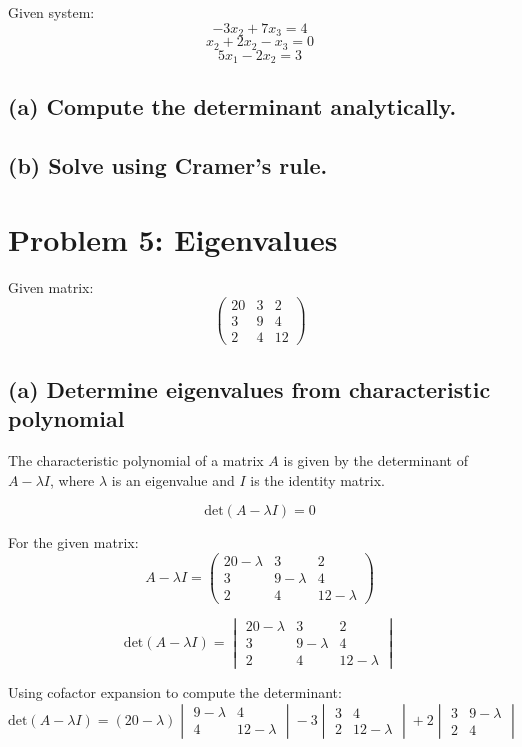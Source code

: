 \documentclass{article}
\begin{document}
Given system:
\[ -3x_2 + 7x_3 = 4 \]
\[ x_2 + 2x_2 - x_3 = 0 \]
\[ 5x_1 - 2x_2 = 3 \]

\subsection*{(a) Compute the determinant analytically.}

\subsection*{(b) Solve using Cramer's rule.}

\section*{Problem 5: Eigenvalues}

Given matrix:
\[ \begin{pmatrix} 20 & 3 & 2 \\ 3 & 9 & 4 \\ 2 & 4 & 12 \end{pmatrix} \]

\subsection*{(a) Determine eigenvalues from characteristic polynomial}

The characteristic polynomial of a matrix \( A \) is given by the determinant of \( A - \lambda I \), where \( \lambda \) is an eigenvalue and \( I \) is the identity matrix.

\[ \text{det}(A - \lambda I) = 0 \]

For the given matrix:
\[ A - \lambda I = \begin{pmatrix} 20 - \lambda & 3 & 2 \\ 3 & 9 - \lambda & 4 \\ 2 & 4 & 12 - \lambda \end{pmatrix} \]

\[ \text{det}(A - \lambda I) = \begin{vmatrix} 20 - \lambda & 3 & 2 \\ 3 & 9 - \lambda & 4 \\ 2 & 4 & 12 - \lambda \end{vmatrix} \]

Using cofactor expansion to compute the determinant:
\[ \text{det}(A - \lambda I) = (20 - \lambda) \begin{vmatrix} 9 - \lambda & 4 \\ 4 & 12 - \lambda \end{vmatrix} - 3 \begin{vmatrix} 3 & 4 \\ 2 & 12 - \lambda \end{vmatrix} + 2 \begin{vmatrix} 3 & 9 - \lambda \\ 2 & 4 \end{vmatrix} \]
\end{document}
